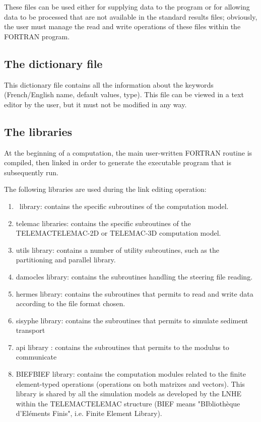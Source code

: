  These files can be used either for supplying data to the program or for allowing data to be processed that are not available in the standard results files; obviously, the user must manage the read and write operations of these files within the FORTRAN program.


\subsection{ The dictionary file}

 This dictionary file contains all the information about the keywords (French/English name, default values, type). This file can be viewed in a text editor by the user, but it must not be modified in any way.


\subsection{ The libraries}

 At the beginning of a computation, the main user-written FORTRAN routine is compiled, then linked in order to generate the executable program that is subsequently run.

 The following libraries are used during the link editing operation:

\begin{enumerate}
\item  \tomawac~library: contains the specific subroutines of the \tomawac computation model.

\item  telemac libraries: contains the specific subroutines of the TELEMACTELEMAC-2D or TELEMAC-3D computation model.

\item  utils library: contains a number of utility subroutines, such as the partitioning and parallel library.

\item  damocles library: contains the subroutines handling the steering file reading.

\item  hermes library: contains the subroutines that permits to read and write data according to the file format chosen.

\item  sisyphe library: contains the subroutines that permits to simulate sediment transport

\item  api library : contains the subroutines that permits to the modulus to communicate

\item  BIEFBIEF library: contains the computation modules related to the finite element-typed operations (operations on both matrixes and vectors). This library is shared by all the simulation models as developed by the LNHE within the TELEMACTELEMAC structure (BIEF means "BIbliothèque d'Eléments Finis", i.e. Finite Element Library).
\end{enumerate}


